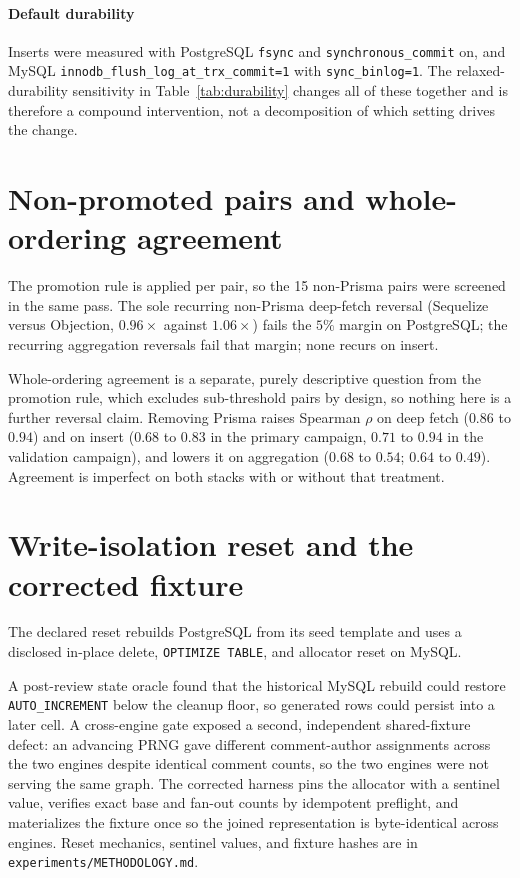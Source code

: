 \documentclass[11pt,a4paper]{article}
\begin{document}
\paragraph{Default durability} Inserts were measured with PostgreSQL \texttt{fsync} and
\texttt{synchronous\_commit} on, and MySQL \texttt{innodb\_flush\_log\_at\_trx\_commit=1} with
\texttt{sync\_binlog=1}. The relaxed-durability sensitivity in Table~\ref{tab:durability} changes
all of these together and is therefore a compound intervention, not a decomposition of which
setting drives the change.

\section{Non-promoted pairs and whole-ordering agreement}
\label{sup:rq2-detail}
The promotion rule is applied per pair, so the 15 non-Prisma pairs were screened in the same pass.
The sole recurring non-Prisma deep-fetch reversal (Sequelize versus Objection, $0.96\times$ against
$1.06\times$) fails the $5\%$ margin on PostgreSQL; the recurring aggregation reversals fail that
margin; none recurs on insert.

Whole-ordering agreement is a separate, purely descriptive question from the promotion rule, which
excludes sub-threshold pairs by design, so nothing here is a further reversal claim. Removing Prisma
raises Spearman $\rho$ on deep fetch ($0.86$ to $0.94$) and on insert ($0.68$ to $0.83$ in the
primary campaign, $0.71$ to $0.94$ in the validation campaign), and lowers it on aggregation ($0.68$
to $0.54$; $0.64$ to $0.49$). Agreement is imperfect on both stacks with or without that treatment.

\section{Write-isolation reset and the corrected fixture}
\label{sup:reset}
The declared reset rebuilds PostgreSQL from its seed template and uses a disclosed in-place
delete, \texttt{OPTIMIZE TABLE}, and allocator reset on MySQL.

A post-review state oracle found that the historical MySQL rebuild could restore
\texttt{AUTO\_INCREMENT} below the cleanup floor, so generated rows could persist into a later
cell. A cross-engine gate exposed a second, independent shared-fixture defect: an advancing PRNG
gave different comment-author assignments across the two engines despite identical comment counts,
so the two engines were not serving the same graph. The corrected harness pins the allocator with a
sentinel value, verifies exact base and fan-out counts by idempotent preflight, and materializes the
fixture once so the joined representation is byte-identical across engines. Reset mechanics,
sentinel values, and fixture hashes are in \texttt{experiments/METHODOLOGY.md}.
\end{document}
